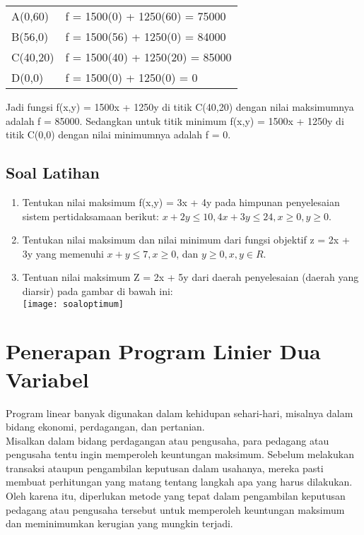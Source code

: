 \documentclass[11pt,fleqn]{book} %
\begin{document}
\begin{tabular}{l l}
A(0,60) & f = 1500(0) + 1250(60) = 75000 \\
B(56,0) & f = 1500(56) + 1250(0) = 84000 \\
C(40,20) & f = 1500(40) + 1250(20) = 85000 \\
D(0,0) & f = 1500(0) + 1250(0) = 0 \\
\end{tabular}

Jadi fungsi f(x,y) = 1500x + 1250y di titik C(40,20) dengan nilai maksimumnya adalah f = 85000. Sedangkan untuk titik minimum f(x,y) = 1500x + 1250y di titik C(0,0) dengan nilai minimumnya adalah f = 0.

\subsection{Soal Latihan }


\begin{exercise}

\begin{enumerate}
\item Tentukan nilai maksimum f(x,y) = 3x + 4y pada himpunan penyelesaian sistem pertidaksamaan berikut: $x + 2y \le 10, 4x + 3y \le 24, x \ge 0, y \ge 0.$
\item Tentukan nilai maksimum dan nilai minimum dari fungsi objektif z = 2x + 3y yang memenuhi $x + y \le 7, x \ge 0$, dan $y \ge 0, x,y \in R.$
\item Tentuan nilai maksimum Z = 2x + 5y dari daerah penyelesaian (daerah yang diarsir) pada gambar di bawah ini:\\
\texttt{[image: soaloptimum]}
\end{enumerate}
\end{exercise}

\section{Penerapan Program Linier Dua Variabel}
Program linear banyak digunakan dalam kehidupan sehari-hari, misalnya dalam bidang ekonomi, perdagangan, dan pertanian.\\

Misalkan dalam bidang perdagangan atau pengusaha, para pedagang atau pengusaha tentu ingin memperoleh keuntungan maksimum. Sebelum melakukan transaksi ataupun pengambilan keputusan dalam usahanya, mereka pasti membuat perhitungan yang matang tentang langkah apa yang harus dilakukan. Oleh karena itu, diperlukan metode yang tepat dalam pengambilan keputusan pedagang atau pengusaha tersebut untuk memperoleh keuntungan maksimum dan meminimumkan kerugian yang mungkin terjadi.\\
\end{document}
